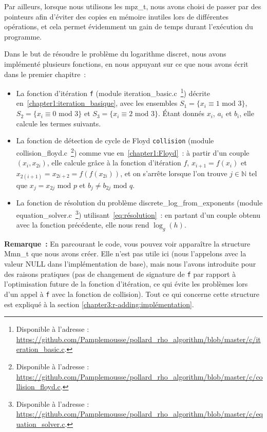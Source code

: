           Par ailleurs, lorsque nous utilisons les mpz\_t, nous avons choisi de passer par des pointeurs afin d'éviter des copies en mémoire inutiles lors de différentes opérations, et cela permet évidemment un gain de temps durant l'exécution du programme.

          Dans le but de résoudre le problème du logarithme discret, nous avons implémenté plusieurs fonctions, en nous appuyant sur ce que nous avons écrit dans le premier chapitre~:

          \begin{itemize}
            \item La fonction d'itération \lstinline{f} (module iteration\_basic.c~\footnote{Disponible à l'adresse : \url{https://github.com/Pamplemousse/pollard_rho_algorithm/blob/master/c/iteration_basic.c}.}) décrite en~\ref{chapter1:iteration_basique}, avec les ensembles $S_1 = \{ x_i \equiv 1 \text{ mod } 3 \}$, $S_2 = \{ x_i \equiv 0 \text{ mod } 3 \}$ et $S_3 = \{ x_i \equiv 2 \text{ mod } 3 \}$. Étant donnés $x_i$, $a_i$ et $b_i$, elle calcule les termes suivants.
            \item La fonction de détection de cycle de Floyd \lstinline{collision} (module collision\_floyd.c~\footnote{Disponible à l'adresse : \url{https://github.com/Pamplemousse/pollard_rho_algorithm/blob/master/c/collision_floyd.c}.}) comme vue en~\ref{chapter1:Floyd}~: à partir d'un couple $(x_i, x_{2i})$, elle calcule grâce à la fonction d'itération $f$, $x_{i+1} = f(x_i)$ et $x_{2(i+1)} = x_{2i+2} = f(f(x_{2i}))$, et on s'arrête lorsque l'on trouve $j \in \mathbb{N}$ tel que $x_j = x_{2j} \text{ mod } p$ et $b_j \neq b_{2j} \text{ mod } q$.
            \item La fonction de résolution du problème discrete\_log\_from\_exponents (module equation\_solver.c~\footnote{Disponible à l'adresse : \url{https://github.com/Pamplemousse/pollard_rho_algorithm/blob/master/c/equation_solver.c}.}) utilisant~\eqref{eq:résolution}~: en partant d'un couple obtenu avec la fonction précédente, elle nous rend $\log_g(h)$.
          \end{itemize}

          \textbf{Remarque~:} En parcourant le code, vous pouvez voir apparaître la structure Mmn\_t que nous avons créer. Elle n'est pas utile ici (nous l'appelons avec la valeur NULL dans l'implémentation de base), mais nous l'avons introduite pour des raisons pratiques (pas de changement de signature de \lstinline{f} par rapport à l'optimisation future de la fonction d'itération, ce qui évite les problèmes lors d'un appel à \lstinline{f} avec la fonction de collision). Tout ce qui concerne cette structure est expliqué à la section \ref{chapter3:r-adding:implémentation}.\\

